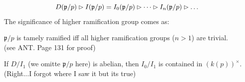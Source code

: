 \begin{equation}
    \notag
    D(\mathfrak{p}/p) \rhd I(\mathfrak{p}/p) = I_0 (\mathfrak{p}/p) \rhd \dots \rhd I_n (\mathfrak{p}/p) \rhd \dots
\end{equation}
The significance of higher ramification group comes as:
\begin{thm}
    \label{thm:thm-25}
    $\mathfrak{p}/p$ is tamely ramified iff all higher ramification groups ($n > 1$) are trivial. \\
    \rm{(see ANT. Page 131 for proof)}
\end{thm}
\begin{thm}
    \label{thm:thm-26}
    If $D/I_1$ (we omitte $\mathfrak{p}/p$ here) is abelian, then $I_0/I_1$ is contained in $(k(p))^\times$.\\
    \rm{(Right...I forgot where I saw it but its true)}
\end{thm}